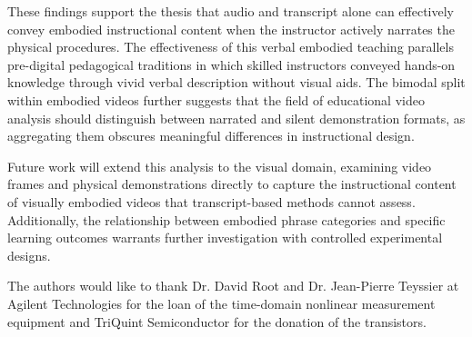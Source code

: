 These findings support the thesis that audio and transcript alone can effectively convey embodied instructional content when the instructor actively narrates the physical procedures. The effectiveness of this verbal embodied teaching parallels pre-digital pedagogical traditions in which skilled instructors conveyed hands-on knowledge through vivid verbal description without visual aids. The bimodal split within embodied videos further suggests that the field of educational video analysis should distinguish between narrated and silent demonstration formats, as aggregating them obscures meaningful differences in instructional design.

Future work will extend this analysis to the visual domain, examining video frames and physical demonstrations directly to capture the instructional content of visually embodied videos that transcript-based methods cannot assess. Additionally, the relationship between embodied phrase categories and specific learning outcomes warrants further investigation with controlled experimental designs.








The authors would like to thank Dr. David Root and Dr. Jean-Pierre Teyssier at Agilent Technologies for the loan of the time-domain nonlinear measurement equipment and TriQuint Semiconductor for the donation of the transistors. 




%

